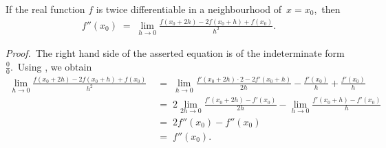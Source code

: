\documentclass[12pt]{article}
\theoremstyle{definition}
\begin{document}
If the real function $f$ is  twice differentiable  in a neighbourhood of\, $x = x_0$,\, then
\begin{align}
f''(x_0) \;=\; \lim_{h \to 0}\frac{f(x_0\!+\!2h)-2f(x_0\!+\!h)+f(x_0)}{h^2}.
\end{align}


\emph{Proof.}\, The right hand side of the asserted equation is of the indeterminate form $\frac{0}{0}$.\, Using 
, we obtain
\begin{align*}
\lim_{h \to 0}\frac{f(x_0\!+\!2h)-2f(x_0\!+\!h)+f(x_0)}{h^2} &\;=\; 
\lim_{h \to 0}\frac{f'(x_0\!+\!2h)\cdot2-2f'(x_0\!+\!h)}{2h}-\frac{f'(x_0)}{h}+\frac{f'(x_0)}{h}\\
&\;=\;2\lim_{2h \to 0}\frac{f'(x_0\!+\!2h)-f'(x_0)}{2h}-\lim_{h \to 0}\frac{f'(x_0\!+\!h)-f'(x_0)}{h} \\
&\;=\; 2f''(x_0)-f''(x_0) \\
&\;=\; f''(x_0).
\end{align*}
\end{document}
